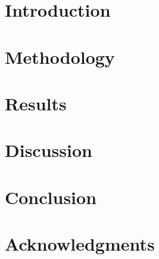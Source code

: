 
\section{Introduction}
\label{sec:Introduction}



\section{Methodology}\label{sec:Methodology}



\section{Results}

\section{Discussion}\label{sec:Discussion}


\glsresetall
\section{Conclusion}
\label{sec:Conclusion}



\section{Acknowledgments}




